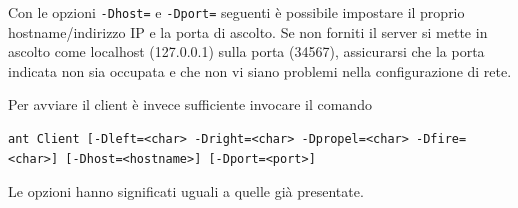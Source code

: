 \documentclass[a4paper,12pt]{article}
\begin{document}
Con le opzioni \texttt{-Dhost=} e \texttt{-Dport=} seguenti \`e possibile impostare il proprio hostname/indirizzo IP e la porta di ascolto. Se non forniti il server si mette in ascolto come localhost (127.0.0.1) sulla porta (34567), assicurarsi che la porta indicata non sia occupata e che non vi siano problemi nella configurazione di rete.

Per avviare il client \`e invece sufficiente invocare il comando 
\begin{lstlisting}[basicstyle=\ttfamily]
ant Client [-Dleft=<char> -Dright=<char> -Dpropel=<char> -Dfire=<char>] [-Dhost=<hostname>] [-Dport=<port>]
\end{lstlisting}

Le opzioni hanno significati uguali a quelle gi\`a presentate.

\newpage
\listoffigures
\end{document}
